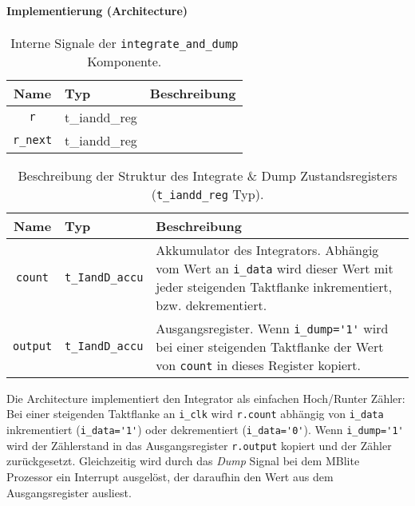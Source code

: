 \paragraph{Implementierung (Architecture)}

\begin{table}[htbp]
    \ttabbox
    {
        \caption[Carrier NCO interne Signale]{Interne Signale der \lstinline$integrate_and_dump$ Komponente.}
        \label{TabIandD_ArchSignals}
    }
    {
    \begin{tabular}{c  p{2cm} p{6cm}}
        \toprule
        Name      		& Typ         & Beschreibung \\
        \midrule
        \lstinline$r$		& t_iandd_reg & \\
        \lstinline$r_next$	& t_iandd_reg & \\
        \bottomrule
    \end{tabular}
}
\end{table}

\begin{table}[htbp]
    \ttabbox
    {
        \caption[Typdefinition Code NCO Zustandsregister]{Beschreibung der Struktur des Integrate \& Dump Zustandsregisters (\lstinline$t_iandd_reg$ Typ).}
        \label{Tab_t_iandd_reg_Type}
    }
    {
    \begin{tabular}{c  p{2cm} p{6cm}}
        \toprule
        Name				& Typ						& Beschreibung \\
        \midrule
        \lstinline$count$		& \lstinline$t_IandD_accu$	&  Akkumulator des Integrators. Abhängig vom Wert an \lstinline$i_data$ wird dieser Wert mit jeder steigenden Taktflanke inkrementiert, bzw. dekrementiert.\\
        \lstinline$output$		& \lstinline$t_IandD_accu$	&  Ausgangsregister. Wenn \lstinline$i_dump='1'$ wird bei einer steigenden Taktflanke der Wert von \lstinline$count$ in dieses Register kopiert. \\
        \bottomrule
    \end{tabular}
}
\end{table}

Die Architecture implementiert den Integrator als einfachen Hoch/Runter Zähler: Bei einer steigenden Taktflanke an \lstinline$i_clk$ wird \lstinline$r.count$ abhängig von \lstinline$i_data$ inkrementiert (\lstinline$i_data='1'$) oder dekrementiert (\lstinline$i_data='0'$). Wenn \lstinline$i_dump='1'$ wird der Zählerstand in das Ausgangsregister \lstinline$r.output$ kopiert und der Zähler zurückgesetzt. Gleichzeitig wird durch das \emph{Dump} Signal bei dem MBlite Prozessor ein Interrupt ausgelöst, der daraufhin den Wert aus dem Ausgangsregister ausliest.
